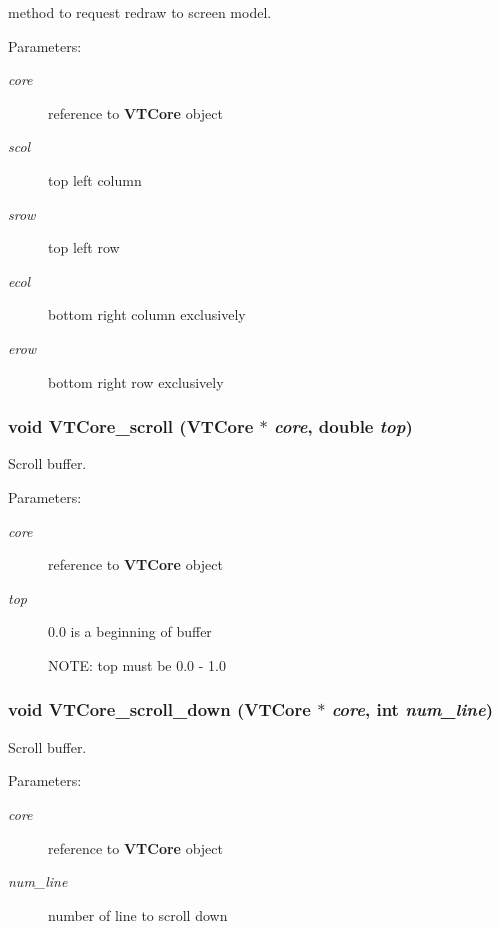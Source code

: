 method to request redraw to screen model.

\begin{Desc}
\item[Parameters:]
\begin{description}
\item[{\em core}]reference to {\bf VTCore} object \item[{\em scol}]top left column \item[{\em srow}]top left row \item[{\em ecol}]bottom right column exclusively \item[{\em erow}]bottom right row exclusively \end{description}
\end{Desc}
\subsubsection{\setlength{\rightskip}{0pt plus 5cm}void VTCore\_\-scroll ({\bf VTCore} $\ast$ {\em core}, double {\em top})}\label{core_8h_a57}


Scroll buffer.

\begin{Desc}
\item[Parameters:]
\begin{description}
\item[{\em core}]reference to {\bf VTCore} object \item[{\em top}]0.0 is a beginning of buffer \par
 NOTE: top must be 0.0 - 1.0 \end{description}
\end{Desc}
\subsubsection{\setlength{\rightskip}{0pt plus 5cm}void VTCore\_\-scroll\_\-down ({\bf VTCore} $\ast$ {\em core}, int {\em num\_\-line})}\label{core_8h_a61}


Scroll buffer.

\begin{Desc}
\item[Parameters:]
\begin{description}
\item[{\em core}]reference to {\bf VTCore} object \item[{\em num\_\-line}]number of line to scroll down \end{description}
\end{Desc}
